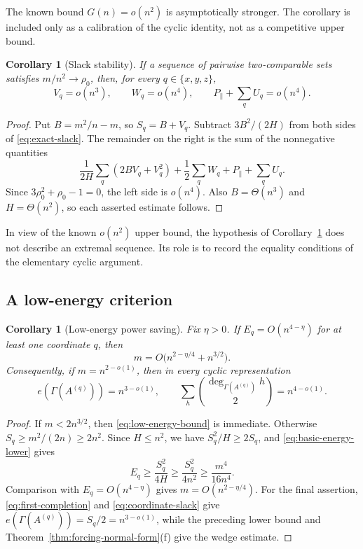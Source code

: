 \documentclass[11pt]{article}
\numberwithin{equation}{section}
\newtheorem{corollary}[theorem]{Corollary}
\theoremstyle{definition}
\theoremstyle{remark}
\begin{document}
The known bound $G(n)=o(n^2)$ is asymptotically stronger.  The corollary is
included only as a calibration of the cyclic identity, not as a competitive
upper bound.

\begin{corollary}[Slack stability]\label{cor:slack-stability}
If a sequence of pairwise two-comparable sets satisfies
$m/n^2\to\rho_0$, then, for every $q\in\{x,y,z\}$,
\[
 V_q=o(n^3),\qquad W_q=o(n^4),\qquad
 P_{\parallel}+\sum_qU_q=o(n^4).
\]
\end{corollary}

\begin{proof}
Put $B=m^2/n-m$, so $S_q=B+V_q$.  Subtract $3B^2/(2H)$ from both sides of
\eqref{eq:exact-slack}.  The remainder on the right is the sum of the
nonnegative quantities
\[
 \frac1{2H}\sum_q(2BV_q+V_q^2)
 +\frac12\sum_qW_q+P_{\parallel}+\sum_qU_q.
\]
Since $3\rho_0^2+\rho_0-1=0$, the left side is $o(n^4)$.  Also
$B=\Theta(n^3)$ and $H=\Theta(n^2)$, so each asserted estimate follows.
\end{proof}

In view of the known $o(n^2)$ upper bound, the hypothesis of
Corollary~\ref{cor:slack-stability} does not describe an extremal sequence.
Its role is to record the equality conditions of the elementary cyclic
argument.

\subsection{A low-energy criterion}

\begin{corollary}[Low-energy power saving]\label{cor:low-energy}
Fix $\eta>0$.  If $E_q=O(n^{4-\eta})$ for at least one coordinate $q$, then
\begin{equation}\label{eq:low-energy-bound}
 m=O\bigl(n^{2-\eta/4}+n^{3/2}\bigr).
\end{equation}
Consequently, if $m=n^{2-o(1)}$, then in every cyclic representation
\[
 e(\Gamma(A^{(q)}))=n^{3-o(1)},
 \qquad
 \sum_h\binom{\deg_{\Gamma(A^{(q)})}h}{2}=n^{4-o(1)}.
\]
\end{corollary}

\begin{proof}
If $m<2n^{3/2}$, then \eqref{eq:low-energy-bound} is immediate.  Otherwise
$S_q\ge m^2/(2n)\ge2n^2$.  Since $H\le n^2$, we have
$S_q^2/H\ge2S_q$, and \eqref{eq:basic-energy-lower} gives
\[
 E_q\ge\frac{S_q^2}{4H}
 \ge\frac{S_q^2}{4n^2}
 \ge\frac{m^4}{16n^4}.
\]
Comparison with $E_q=O(n^{4-\eta})$ gives
$m=O(n^{2-\eta/4})$.  For the final assertion,
\eqref{eq:first-completion} and \eqref{eq:coordinate-slack} give
$e(\Gamma(A^{(q)}))=S_q/2=n^{3-o(1)}$, while the preceding lower bound and
Theorem~\ref{thm:forcing-normal-form}(f) give the wedge estimate.
\end{proof}
\end{document}
